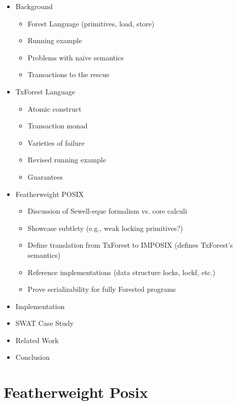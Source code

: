\documentclass[nocopyrightspace]{sigplanconf}
\begin{document}
\begin{itemize}
\item Background
\begin{itemize}
\item Forest Language (primitives, load, store)
\item Running example 
\item Problems with naive semantics
\item Transactions to the rescue
\end{itemize}
\item TxForest Language
\begin{itemize}
\item Atomic construct 
\item Transaction monad
\item Varieties of failure
\item Revised running example
\item Guarantees
\end{itemize}
\item Featherweight POSIX
\begin{itemize}
\item Discussion of Sewell-eque formalism vs. core calculi  
\item Showcase subtlety (e.g., weak locking primitives?)
\item Define translation from TxForest to IMPOSIX (defines TxForest's semantics)
\item Reference implementations (data structure locks, lockf, etc.)
\item Prove serializability for fully Forested programs
\end{itemize}
\item Implementation
\item SWAT Case Study
\item Related Work
\item Conclusion
\end{itemize}





\section{Featherweight Posix}
\label{sec:posix}





 
 
\balance  

\end{document}
